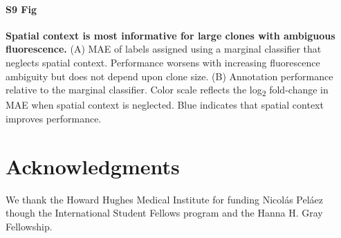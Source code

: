 \documentclass[10pt,letterpaper]{article}
\begin{document}
\paragraph*{S9 Fig} 
\label{S9_Fig}
{\bf Spatial context is most informative for large clones with ambiguous fluorescence.} (A) MAE of labels assigned using a marginal classifier that neglects spatial context. Performance worsens with increasing fluorescence ambiguity but does not depend upon clone size. (B) Annotation performance relative to the marginal classifier. Color scale reflects the log\textsubscript{2} fold-change in MAE when spatial context is neglected. Blue indicates that spatial context improves performance.



\section*{Acknowledgments}
We thank the Howard Hughes Medical Institute for funding Nicol\'as Pel\'aez though the International Student Fellows program and the Hanna H. Gray Fellowship.

\nolinenumbers

%
%
% 
\end{document}
